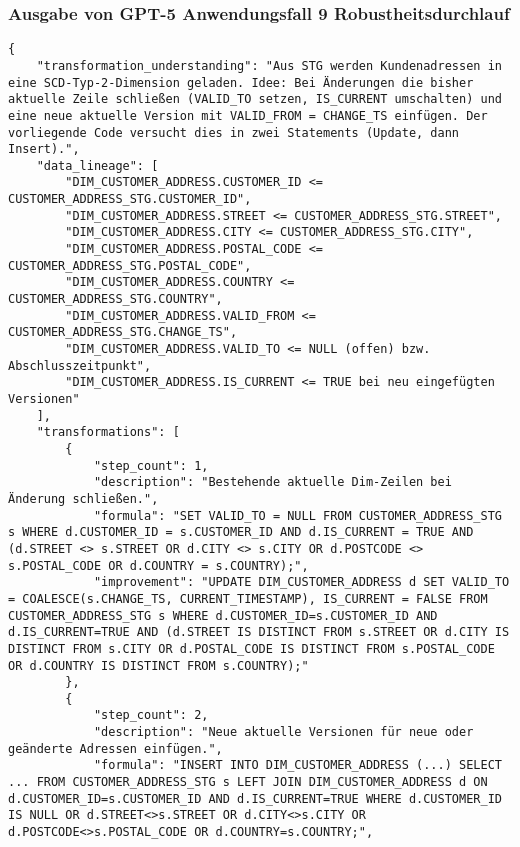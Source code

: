 \subsubsection{Ausgabe von GPT-5 Anwendungsfall 9 Robustheitsdurchlauf}\label{anhang:subsubsec:gpt_case9_prompt3}
\begin{lstlisting}[caption={Ausgabe: GPT-5 Anwendungsfall 9 Robustheitsdurchlauf},label={gpt_case9_prompt3}]
{
    "transformation_understanding": "Aus STG werden Kundenadressen in eine SCD-Typ-2-Dimension geladen. Idee: Bei Änderungen die bisher aktuelle Zeile schließen (VALID_TO setzen, IS_CURRENT umschalten) und eine neue aktuelle Version mit VALID_FROM = CHANGE_TS einfügen. Der vorliegende Code versucht dies in zwei Statements (Update, dann Insert).",
    "data_lineage": [
        "DIM_CUSTOMER_ADDRESS.CUSTOMER_ID <= CUSTOMER_ADDRESS_STG.CUSTOMER_ID",
        "DIM_CUSTOMER_ADDRESS.STREET <= CUSTOMER_ADDRESS_STG.STREET",
        "DIM_CUSTOMER_ADDRESS.CITY <= CUSTOMER_ADDRESS_STG.CITY",
        "DIM_CUSTOMER_ADDRESS.POSTAL_CODE <= CUSTOMER_ADDRESS_STG.POSTAL_CODE",
        "DIM_CUSTOMER_ADDRESS.COUNTRY <= CUSTOMER_ADDRESS_STG.COUNTRY",
        "DIM_CUSTOMER_ADDRESS.VALID_FROM <= CUSTOMER_ADDRESS_STG.CHANGE_TS",
        "DIM_CUSTOMER_ADDRESS.VALID_TO <= NULL (offen) bzw. Abschlusszeitpunkt",
        "DIM_CUSTOMER_ADDRESS.IS_CURRENT <= TRUE bei neu eingefügten Versionen"
    ],
    "transformations": [
        {
            "step_count": 1,
            "description": "Bestehende aktuelle Dim-Zeilen bei Änderung schließen.",
            "formula": "SET VALID_TO = NULL FROM CUSTOMER_ADDRESS_STG s WHERE d.CUSTOMER_ID = s.CUSTOMER_ID AND d.IS_CURRENT = TRUE AND (d.STREET <> s.STREET OR d.CITY <> s.CITY OR d.POSTCODE <> s.POSTAL_CODE OR d.COUNTRY = s.COUNTRY);",
            "improvement": "UPDATE DIM_CUSTOMER_ADDRESS d SET VALID_TO = COALESCE(s.CHANGE_TS, CURRENT_TIMESTAMP), IS_CURRENT = FALSE FROM CUSTOMER_ADDRESS_STG s WHERE d.CUSTOMER_ID=s.CUSTOMER_ID AND d.IS_CURRENT=TRUE AND (d.STREET IS DISTINCT FROM s.STREET OR d.CITY IS DISTINCT FROM s.CITY OR d.POSTAL_CODE IS DISTINCT FROM s.POSTAL_CODE OR d.COUNTRY IS DISTINCT FROM s.COUNTRY);"
        },
        {
            "step_count": 2,
            "description": "Neue aktuelle Versionen für neue oder geänderte Adressen einfügen.",
            "formula": "INSERT INTO DIM_CUSTOMER_ADDRESS (...) SELECT ... FROM CUSTOMER_ADDRESS_STG s LEFT JOIN DIM_CUSTOMER_ADDRESS d ON d.CUSTOMER_ID=s.CUSTOMER_ID AND d.IS_CURRENT=TRUE WHERE d.CUSTOMER_ID IS NULL OR d.STREET<>s.STREET OR d.CITY<>s.CITY OR d.POSTCODE<>s.POSTAL_CODE OR d.COUNTRY=s.COUNTRY;",

\end{lstlisting}
